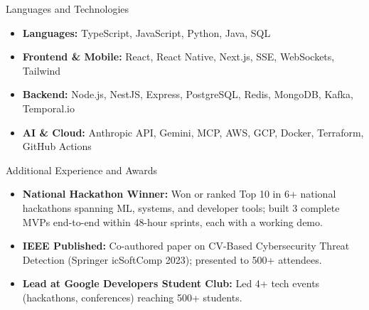 \documentclass[]{mcdowellcv}
\begin{document}
\begin{cvsection}{Languages and Technologies}
  \begin{cvsubsection}{}{}{}
    \begin{itemize}
      \item \textbf{Languages:} TypeScript, JavaScript, Python, Java, SQL
      \item \textbf{Frontend \& Mobile:} React, React Native, Next.js, SSE, WebSockets, Tailwind
      \item \textbf{Backend:} Node.js, NestJS, Express, PostgreSQL, Redis, MongoDB, Kafka, Temporal.io
      \item \textbf{AI \& Cloud:} Anthropic API, Gemini, MCP, AWS, GCP, Docker, Terraform, GitHub Actions
    \end{itemize}
  \end{cvsubsection}
\end{cvsection}

\begin{cvsection}{Additional Experience and Awards}
  \begin{cvsubsection}{}{}{}
    \begin{itemize}
      \item \textbf{National Hackathon Winner:} Won or ranked Top 10 in 6+ national hackathons spanning ML, systems, and developer tools; built 3 complete MVPs end-to-end within 48-hour sprints, each with a working demo.
      \item \textbf{IEEE Published:} Co-authored paper on CV-Based Cybersecurity Threat Detection (Springer icSoftComp 2023); presented to 500+ attendees.
      \item \textbf{Lead at Google Developers Student Club:} Led 4+ tech events (hackathons, conferences) reaching 500+ students.
    \end{itemize}
  \end{cvsubsection}
\end{cvsection}
\end{document}
